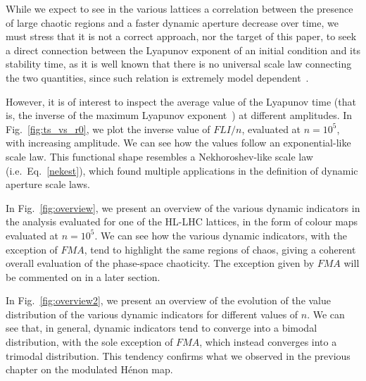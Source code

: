 While we expect to see in the various lattices a correlation between the presence of large chaotic regions and a faster dynamic aperture decrease over time, we must stress that it is not a correct approach, nor the target of this paper, to seek a direct connection between the Lyapunov exponent of an initial condition and its stability time, as it is well known that there is no universal scale law connecting the two quantities, since such relation is extremely model dependent~\cite{Morbidelli1995}.

However, it is of interest to inspect the average value of the Lyapunov time (that is, the inverse of the maximum Lyapunov exponent~\cite{Tancredi_2001}) at different amplitudes. In Fig.~\ref{fig:ts_vs_r0}, we plot the inverse value of $FLI/n$, evaluated at $n=10^5$, with increasing amplitude. We can see how the values follow an exponential-like scale law. This functional shape resembles a Nekhoroshev-like scale law (i.e.\ Eq.~\eqref{nekest}), which found multiple applications in the definition of dynamic aperture scale laws.

In Fig.~\ref{fig:overview}, we present an overview of the various dynamic indicators in the analysis evaluated for one of the HL-LHC lattices, in the form of colour maps evaluated at $n=10^5$. We can see how the various dynamic indicators, with the exception of $FMA$, tend to highlight the same regions of chaos, giving a coherent overall evaluation of the phase-space chaoticity. The exception given by $FMA$ will be commented on in a later section. 

In Fig.~\ref{fig:overview2}, we present an overview of the evolution of the value distribution of the various dynamic indicators for different values of $n$. We can see that, in general, dynamic indicators tend to converge into a bimodal distribution, with the sole exception of $FMA$, which instead converges into a trimodal distribution. This tendency confirms what we observed in the previous chapter on the modulated Hénon map.

